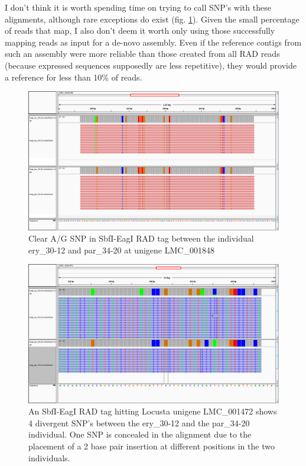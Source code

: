 \documentclass{article}\usepackage[]{graphicx}\usepackage[]{color}
\begin{document}
I don't think it is worth spending time on trying to call SNP's with these alignments, although rare exceptions do exist (fig. \ref{igv_LMC_001848}). Given the small percentage of reads that map, I also don't deem it worth only using those successfully mapping reads as input for a de-novo assembly. Even if the reference contigs from such an assembly were more reliable than those created from all RAD reads (because expressed sequences supposedly are less repetitive), they would provide a reference for less than 10\% of reads. 

\begin{figure}
\centering
\includegraphics[width=\textwidth]{./figure/igv_LMC_001848}
\caption{Clear A/G SNP in SbfI-EagI RAD tag between the individual ery\_30-12 and par\_34-20 at unigene LMC\_001848}
\label{igv_LMC_001848}
\end{figure}

\begin{figure}
\centering
\includegraphics[width=\textwidth]{./figure/igv_LMC_001472}
\caption{An SbfI-EagI RAD tag hitting Locusta unigene LMC\_001472 shows 4 divergent SNP's between the ery\_30-12  and the par\_34-20 individual. One SNP is concealed in the alignment due to the placement of a 2 base pair insertion at different positions in the two individuals.}
\label{igv_LMC_001472}
\end{figure}
\end{document}
